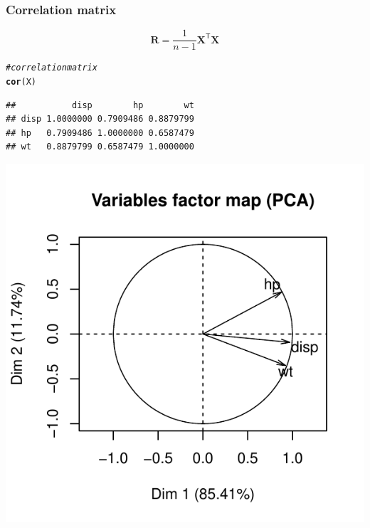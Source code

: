 \documentclass[12pt]{beamer}\usepackage[]{graphicx}\usepackage[]{color}
\makeatletter
\newcommand{\hlcom}[1]{\textcolor[rgb]{0.678,0.584,0.686}{\textit{#1}}}%
\newcommand{\hlstd}[1]{\textcolor[rgb]{0.345,0.345,0.345}{#1}}%
\newcommand{\hlkwd}[1]{\textcolor[rgb]{0.737,0.353,0.396}{\textbf{#1}}}%
\newenvironment{kframe}{%
 \def\at@end@of@kframe{}%
 \ifinner\ifhmode%
  \def\at@end@of@kframe{\end{minipage}}%
  \begin{minipage}{\columnwidth}%
 \fi\fi%
 \def\FrameCommand##1{\hskip\@totalleftmargin \hskip-\fboxsep
 \colorbox{shadecolor}{##1}\hskip-\fboxsep
     \hskip-\linewidth \hskip-\@totalleftmargin \hskip\columnwidth}%
 \MakeFramed {\advance\hsize-\width
   \@totalleftmargin\z@ \linewidth\hsize
   \@setminipage}}%
 {\par\unskip\endMakeFramed%
 \at@end@of@kframe}
\newenvironment{knitrout}{}{} %
\makeatother
\begin{document}

\begin{frame}[fragile]
\frametitle{Correlation matrix}

$$
\mathbf{R} = \frac{1}{n-1} \mathbf{X^\mathsf{T} X}
$$

\begin{knitrout}\footnotesize
{}\color{fgcolor}\begin{kframe}
\begin{alltt}
\hlcom{# correlation matrix}
\hlkwd{cor}\hlstd{(X)}
\end{alltt}
\begin{verbatim}
##           disp        hp        wt
## disp 1.0000000 0.7909486 0.8879799
## hp   0.7909486 1.0000000 0.6587479
## wt   0.8879799 0.6587479 1.0000000
\end{verbatim}
\end{kframe}
\end{knitrout}

\end{frame}


\begin{frame}[fragile]

\begin{knitrout}\footnotesize
{}\color{fgcolor}

{\centering \includegraphics[width=.8\linewidth,height=.8\linewidth]{figure/pca-1} 

}



\end{knitrout}

\end{frame}
\end{document}
